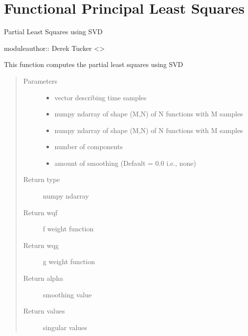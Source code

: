 \documentclass[letterpaper,10pt,english]{sphinxmanual}
\begin{document}
\chapter{Functional Principal Least Squares}
\label{\detokenize{fPLS:module-fPLS}}\label{\detokenize{fPLS:functional-principal-least-squares}}\label{\detokenize{fPLS::doc}}
Partial Least Squares using SVD

moduleauthor:: Derek Tucker \textless{}\textgreater{}

\begin{fulllineitems}
\label{\detokenize{fPLS:fPLS.pls_svd}}
This function computes the partial least squares using SVD
\begin{quote}\begin{description}
\item[{Parameters}] \leavevmode\begin{itemize}
\item {} 
 \textendash{} vector describing time samples

\item {} 
 \textendash{} numpy ndarray of shape (M,N) of N functions with M samples

\item {} 
 \textendash{} numpy ndarray of shape (M,N) of N functions with M samples

\item {} 
 \textendash{} number of components

\item {} 
 \textendash{} amount of smoothing (Default = 0.0 i.e., none)

\end{itemize}

\item[{Return type}] \leavevmode
numpy ndarray

\item[{Return wqf}] \leavevmode
f weight function

\item[{Return wqg}] \leavevmode
g weight function

\item[{Return alpha}] \leavevmode
smoothing value

\item[{Return values}] \leavevmode
singular values

\end{description}\end{quote}

\end{fulllineitems}
\end{document}
